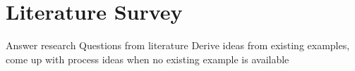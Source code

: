 \chapter{Literature Survey}\label{chapter:LiteratureSurvey}

Answer research Questions from literature
Derive ideas from existing examples, come up with process ideas when no existing example is available

